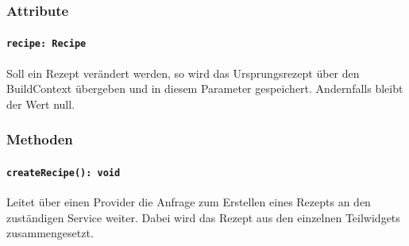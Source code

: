 \documentclass{entwurfsheft}
\begin{document}
\begin{sloppypar}
\subsubsection*{Attribute}
\paragraph{\texttt{recipe: Recipe}}
Soll ein Rezept verändert werden, so wird das Ursprungsrezept über den \Gls{BuildContext} übergeben und in diesem Parameter gespeichert. Andernfalls bleibt der Wert null.
\subsubsection*{Methoden}
\paragraph{\texttt{createRecipe(): void}}
Leitet über einen Provider die Anfrage zum Erstellen eines Rezepts an den zuständigen Service weiter. Dabei wird das Rezept aus den einzelnen Teilwidgets zusammengesetzt.
\newpage

\end{sloppypar}
\end{document}
